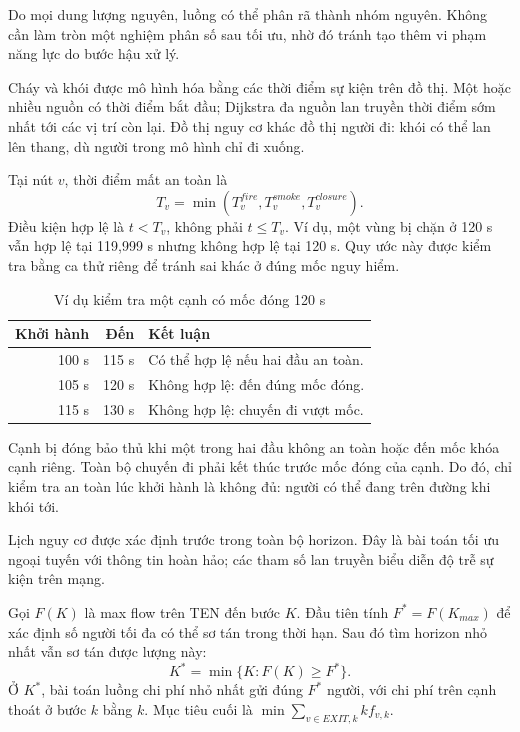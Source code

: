 Do mọi dung lượng nguyên, luồng có thể phân rã thành nhóm nguyên. Không cần làm tròn một nghiệm phân số sau tối ưu, nhờ đó tránh tạo thêm vi phạm năng lực do bước hậu xử lý.

Cháy và khói được mô hình hóa bằng các thời điểm sự kiện trên đồ thị. Một hoặc nhiều nguồn có thời điểm bắt đầu; Dijkstra đa nguồn lan truyền thời điểm sớm nhất tới các vị trí còn lại. Đồ thị nguy cơ khác đồ thị người đi: khói có thể lan lên thang, dù người trong mô hình chỉ đi xuống.

Tại nút $v$, thời điểm mất an toàn là
\begin{equation}T_v=\min(T_v^{fire},T_v^{smoke},T_v^{closure}).\end{equation}
Điều kiện hợp lệ là $t<T_v$, không phải $t\le T_v$. Ví dụ, một vùng bị chặn ở 120 s vẫn hợp lệ tại 119,999 s nhưng không hợp lệ tại 120 s. Quy ước này được kiểm tra bằng ca thử riêng để tránh sai khác ở đúng mốc nguy hiểm.

\begin{table}[htbp]\centering\caption{Ví dụ kiểm tra một cạnh có mốc đóng 120 s}
\small\begin{tabular}{rrl}\toprule Khởi hành & Đến & Kết luận\\\midrule
100 s & 115 s & Có thể hợp lệ nếu hai đầu an toàn.\\
105 s & 120 s & Không hợp lệ: đến đúng mốc đóng.\\
115 s & 130 s & Không hợp lệ: chuyến đi vượt mốc.\\\bottomrule\end{tabular}\end{table}

Cạnh bị đóng bảo thủ khi một trong hai đầu không an toàn hoặc đến mốc khóa cạnh riêng. Toàn bộ chuyến đi phải kết thúc trước mốc đóng của cạnh. Do đó, chỉ kiểm tra an toàn lúc khởi hành là không đủ: người có thể đang trên đường khi khói tới.

Lịch nguy cơ được xác định trước trong toàn bộ horizon. Đây là bài toán tối ưu ngoại tuyến với thông tin hoàn hảo; các tham số lan truyền biểu diễn độ trễ sự kiện trên mạng.

Gọi $F(K)$ là max flow trên TEN đến bước $K$. Đầu tiên tính $F^*=F(K_{max})$ để xác định số người tối đa có thể sơ tán trong thời hạn. Sau đó tìm horizon nhỏ nhất vẫn sơ tán được lượng này:
\begin{equation}K^*=\min\{K:F(K)\ge F^*\}.\end{equation}
Ở $K^*$, bài toán luồng chi phí nhỏ nhất gửi đúng $F^*$ người, với chi phí trên cạnh thoát ở bước $k$ bằng $k$. Mục tiêu cuối là $\min\sum_{v\in EXIT,k}k f_{v,k}$.

